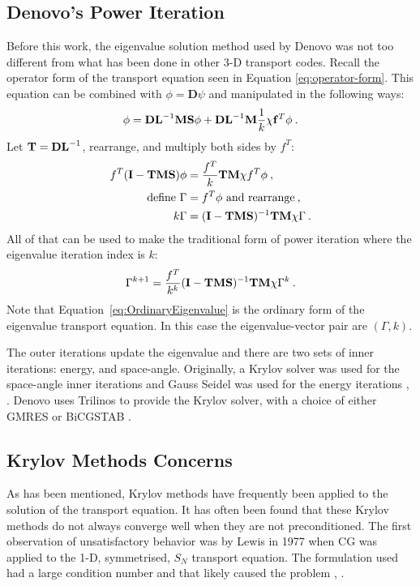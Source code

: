 \subsection{Denovo's Power Iteration}
Before this work, the eigenvalue solution method used by Denovo was not too different from what has been done in other 3-D transport codes. Recall the operator form of the transport equation seen in Equation \eqref{eq:operator-form}. This equation can be combined with $\phi = \mathbf{D} \psi$ and manipulated in the following ways:
%
\begin{equation}
  \phi = \mathbf{DL}^{-1}\mathbf{MS}\phi + \mathbf{DL}^{-1}\mathbf{M}\frac{1}{k}\mathbf{\chi} \mathbf{f}^{T} \phi \:.
\end{equation}
%
Let $\mathbf{T} = \mathbf{DL}^{-1}$, rearrange, and multiply both sides by $f^{T}$:
\begin{align}
  f^{T}(\mathbf{I} - \mathbf{TMS})\phi &= \frac{f^{T}}{k} \mathbf{TM}\chi f^{T} \phi \:, \label{eq:OperatorEvalForm} \\
  \text{define } \Gamma &= f^{T}\phi  \text{ and rearrange} \:, \nonumber \\
  k \Gamma &= (\mathbf{I} - \mathbf{TMS})^{-1} \mathbf{TM} \chi \Gamma \:. \label{eq:OrdinaryEigenvalue}
\end{align}
%
All of that can be used to make the traditional form of power iteration where the eigenvalue iteration index is $k$:
%
\begin{equation}
  \Gamma^{k+1} =  \frac{f^{T}}{k^{k}}(\mathbf{I} - \mathbf{TMS})^{-1} \mathbf{TM} \chi \Gamma^{k} \:.
\label{eq:PowerItForm} 
\end{equation}
Note that Equation~\ref{eq:OrdinaryEigenvalue} is the ordinary form of the eigenvalue transport equation. In this case the eigenvalue-vector pair are $(\Gamma, k)$. 

The outer iterations update the eigenvalue and there are two sets of inner iterations: energy, and space-angle. Originally, a Krylov solver was used for the space-angle inner iterations and Gauss Seidel was used for the energy iterations \cite{Evans2009a}, \cite{Evans2011}. Denovo uses Trilinos \cite{Heroux2003} to provide the Krylov solver, with a choice of either GMRES or BiCGSTAB \cite{Evans2009}.

\subsection{Krylov Methods Concerns}
As has been mentioned, Krylov methods have frequently been applied to the solution of the transport equation. It has often been found that these Krylov methods do not always converge well when they are not preconditioned. The first observation of unsatisfactory behavior was by Lewis in 1977 when CG was applied to the 1-D, symmetrised, $S_{N}$ transport equation. The formulation used had a large condition number and that likely caused the problem \cite{Lewis1977}, \cite{Gupta2004}. 

